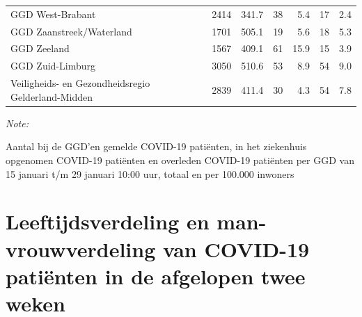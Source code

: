 \documentclass[
  english,
  man,floatsintext]{apa6}
\begin{document}
\begin{table}[H]
\begin{threeparttable}
\begin{tabular}{lrrrrrr}
GGD West-Brabant & 2414 & 341.7 & 38 & 5.4 & 17 & 2.4\\
GGD Zaanstreek/Waterland & 1701 & 505.1 & 19 & 5.6 & 18 & 5.3\\
GGD Zeeland & 1567 & 409.1 & 61 & 15.9 & 15 & 3.9\\
GGD Zuid-Limburg & 3050 & 510.6 & 53 & 8.9 & 54 & 9.0\\
Veiligheids- en Gezondheidsregio Gelderland-Midden & 2839 & 411.4 & 30 & 4.3 & 54 & 7.8\\
\bottomrule
\end{tabular}
\begin{tablenotes}
\item \textit{Note: } 
\item Aantal bij de GGD’en gemelde COVID-19 patiënten, in het ziekenhuis opgenomen COVID-19 patiënten en overleden COVID-19 patiënten per GGD van 15 januari t/m 29 januari 10:00 uur, totaal en per 100.000 inwoners
\end{tablenotes}
\end{threeparttable}
\endgroup{}
\end{table}

\newpage

\hypertarget{leeftijdsverdeling-en-man-vrouwverdeling-van-covid-19-patiuxebnten-in-de-afgelopen-twee-weken}{%
\section{Leeftijdsverdeling en man-vrouwverdeling van COVID-19 patiënten in de afgelopen twee weken}\label{leeftijdsverdeling-en-man-vrouwverdeling-van-covid-19-patiuxebnten-in-de-afgelopen-twee-weken}}
\end{document}
